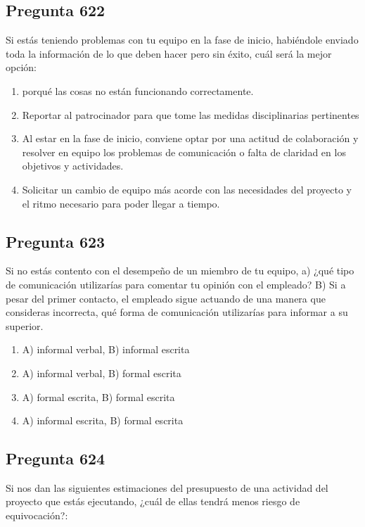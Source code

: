 \documentclass[11pt,a4paper]{article}
\begin{document}
\subsection*{Pregunta 622}
Si estás teniendo problemas con tu equipo en la fase de inicio, habiéndole enviado toda la información de lo que deben hacer pero sin éxito, cuál será la mejor opción:

\begin{enumerate}[label=\alph*)]
  \item porqué las cosas no están funcionando correctamente.
  \item Reportar al patrocinador para que tome las medidas disciplinarias pertinentes
  \item Al estar en la fase de inicio, conviene optar por una actitud de colaboración y resolver en equipo los problemas de comunicación o falta de claridad en los objetivos y actividades.
  \item Solicitar un cambio de equipo más acorde con las necesidades del proyecto y el ritmo necesario para poder llegar a tiempo.
\end{enumerate}

\subsection*{Pregunta 623}
Si no estás contento con el desempeño de un miembro de tu equipo, a) ¿qué tipo de comunicación utilizarías para comentar tu opinión con el empleado? B) Si a pesar del primer contacto, el empleado sigue actuando de una manera que consideras incorrecta, qué forma de comunicación utilizarías para informar a su superior.

\begin{enumerate}[label=\alph*)]
  \item A) informal verbal, B) informal escrita
  \item A) informal verbal, B) formal escrita
  \item A) formal escrita, B) formal escrita
  \item A) informal escrita, B) formal escrita
\end{enumerate}

\subsection*{Pregunta 624}
Si nos dan las siguientes estimaciones del presupuesto de una actividad del proyecto que estás ejecutando, ¿cuál de ellas tendrá menos riesgo de equivocación?:
\end{document}
